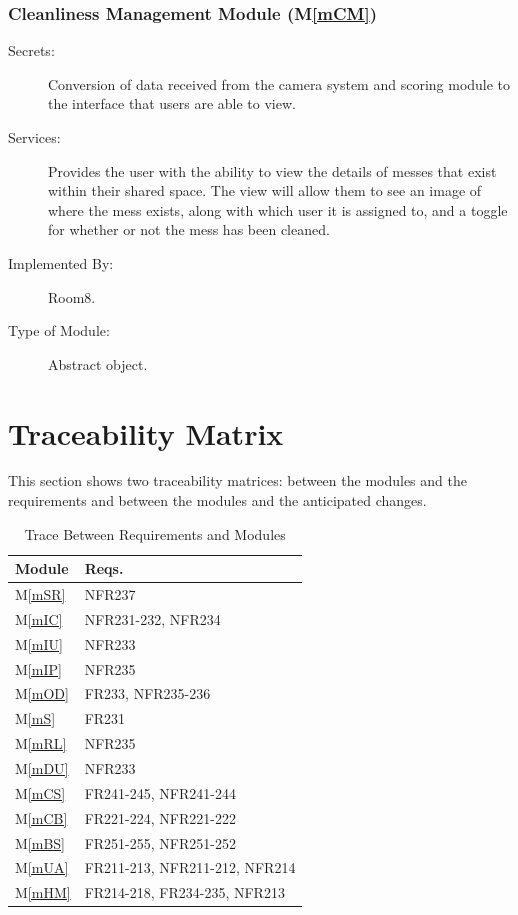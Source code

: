 \documentclass[12pt, titlepage]{article}
\newcommand{\mref}[1]{M\ref{#1}}
\begin{document}
\subsubsection{Cleanliness Management Module (\mref{mCM})}
\begin{description}
\item[Secrets:] Conversion of data received from the camera system and scoring module to the interface that users are able to view.
\item[Services:] Provides the user with the ability to view the details of messes that exist within their shared space. The view will allow them to see an image of where the mess exists, along with which user it is assigned to, and a toggle for whether or not the mess has been cleaned.
\item[Implemented By:] Room8.
\item[Type of Module:] Abstract object.
\end{description}

\section{Traceability Matrix} \label{SecTM}

This section shows two traceability matrices: between the modules and the
requirements and between the modules and the anticipated changes.

\begin{table}[H]
\centering
\begin{tabular}{p{} p{}}
\toprule
\textbf{Module} & \textbf{Reqs.}\\
\midrule
\mref{mSR} & NFR237\\
\mref{mIC} & NFR231-232, NFR234\\
\mref{mIU} & NFR233\\
\mref{mIP} & NFR235\\
\mref{mOD} & FR233, NFR235-236\\
\mref{mS} & FR231\\
\mref{mRL} & NFR235\\
\mref{mDU} & NFR233\\
\mref{mCS} & FR241-245, NFR241-244\\
\mref{mCB} & FR221-224, NFR221-222\\
\mref{mBS} & FR251-255, NFR251-252\\
\mref{mUA} & FR211-213, NFR211-212, NFR214 \\
\mref{mHM} & FR214-218, FR234-235, NFR213 \\

\bottomrule
\end{tabular}
\caption{Trace Between Requirements and Modules}
\label{TblRT}
\end{table}
\end{document}

